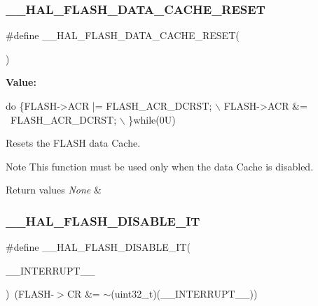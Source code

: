 \subsubsection{\texorpdfstring{\+\_\+\+\_\+\+H\+A\+L\+\_\+\+F\+L\+A\+S\+H\+\_\+\+D\+A\+T\+A\+\_\+\+C\+A\+C\+H\+E\+\_\+\+R\+E\+S\+ET}{\_\_HAL\_FLASH\_DATA\_CACHE\_RESET}}
{\footnotesize\ttfamily \#define \+\_\+\+\_\+\+H\+A\+L\+\_\+\+F\+L\+A\+S\+H\+\_\+\+D\+A\+T\+A\+\_\+\+C\+A\+C\+H\+E\+\_\+\+R\+E\+S\+ET(\begin{DoxyParamCaption}{ }\end{DoxyParamCaption})}

{\bfseries Value\+:}
\begin{DoxyCode}
\textcolor{keywordflow}{do} \{FLASH->ACR |= FLASH\_ACR\_DCRST;  \(\backslash\)
                                           FLASH->ACR &= ~FLASH\_ACR\_DCRST; \(\backslash\)
                                          \}\textcolor{keywordflow}{while}(0U)
\end{DoxyCode}


Resets the F\+L\+A\+SH data Cache. 

\begin{DoxyNote}{Note}
This function must be used only when the data Cache is disabled. 
\end{DoxyNote}

\begin{DoxyRetVals}{Return values}
{\em None} & \\
\hline
\end{DoxyRetVals}
\mbox{\label{group___f_l_a_s_h___exported___macros_ga1f40f507b5d4b3a4da68e4244a1097ee}} 
\subsubsection{\texorpdfstring{\+\_\+\+\_\+\+H\+A\+L\+\_\+\+F\+L\+A\+S\+H\+\_\+\+D\+I\+S\+A\+B\+L\+E\+\_\+\+IT}{\_\_HAL\_FLASH\_DISABLE\_IT}}
{\footnotesize\ttfamily \#define \+\_\+\+\_\+\+H\+A\+L\+\_\+\+F\+L\+A\+S\+H\+\_\+\+D\+I\+S\+A\+B\+L\+E\+\_\+\+IT(\begin{DoxyParamCaption}\item[{}]{\+\_\+\+\_\+\+I\+N\+T\+E\+R\+R\+U\+P\+T\+\_\+\+\_\+ }\end{DoxyParamCaption})~(F\+L\+A\+SH-\/$>$CR \&= $\sim$(uint32\+\_\+t)(\+\_\+\+\_\+\+I\+N\+T\+E\+R\+R\+U\+P\+T\+\_\+\+\_\+))}



